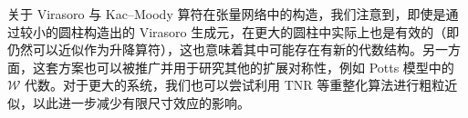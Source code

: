 关于 Virasoro 与 Kac--Moody 算符在张量网络中的构造，我们注意到，即使是通过较小的圆柱构造出的 Virasoro 生成元，在更大的圆柱中实际上也是有效的（即仍然可以近似作为升降算符），这也意味着其中可能存在有新的代数结构。另一方面，这套方案也可以被推广并用于研究其他的扩展对称性，例如 Potts 模型中的 $\mathcal{W}$ 代数\cite{fateev1987conformal}。对于更大的系统，我们也可以尝试利用 TNR 等重整化算法进行粗粒近似，以此进一步减少有限尺寸效应的影响。
